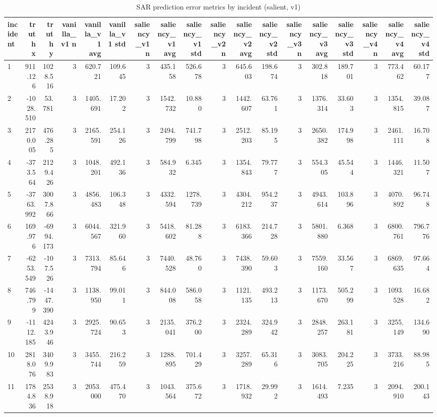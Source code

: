 \begin{table}[ht]
\centering
\caption{SAR prediction error metrics by incident (salient, v1)}
\label{tab:sar-incident-errors-salient,-v1}
\begin{tabular}{lrrrrrrrrrrrrrrrrr}
\hline
incident & truth x & truth y & vanilla\_v1 n & vanilla\_v1 avg & vanilla\_v1 std & saliency\_v1 n & saliency\_v1 avg & saliency\_v1 std & saliency\_v2 n & saliency\_v2 avg & saliency\_v2 std & saliency\_v3 n & saliency\_v3 avg & saliency\_v3 std & saliency\_v4 n & saliency\_v4 avg & saliency\_v4 std \\
\hline
1 & 911.126 & 1028.516 & 3 & 620.721 & 109.645 & 3 & 435.158 & 526.678 & 3 & 645.603 & 198.674 & 3 & 302.818 & 189.701 & 3 & 773.462 & 60.177 \\
2 & -1028.510 & 53.781 & 3 & 1405.691 & 17.202 & 3 & 1542.732 & 10.880 & 3 & 1442.607 & 63.761 & 3 & 1376.314 & 33.603 & 3 & 1354.815 & 39.087 \\
3 & 2170.005 & 476.285 & 3 & 2165.591 & 254.126 & 3 & 2494.799 & 741.798 & 3 & 2512.203 & 85.195 & 3 & 2650.382 & 174.998 & 3 & 2461.111 & 16.708 \\
4 & -373.564 & 2129.426 & 3 & 1048.201 & 492.136 & 3 & 584.932 & 6.345 & 3 & 1354.843 & 79.777 & 3 & 554.305 & 45.544 & 3 & 1446.321 & 11.507 \\
5 & -3763.992 & 3007.866 & 3 & 4856.483 & 106.348 & 3 & 4332.594 & 1278.739 & 3 & 4304.212 & 954.237 & 3 & 4943.614 & 103.896 & 3 & 4070.892 & 96.748 \\
6 & 169.976 & -6994.173 & 3 & 6044.567 & 321.960 & 3 & 5418.602 & 81.288 & 3 & 6183.366 & 214.728 & 3 & 5801.880 & 6.368 & 3 & 6800.761 & 796.776 \\
7 & -6253.549 & -107.526 & 3 & 7313.794 & 85.646 & 3 & 7440.528 & 48.760 & 3 & 7438.390 & 59.603 & 3 & 7559.160 & 33.567 & 3 & 6869.635 & 97.664 \\
8 & 746.799 & -1447.390 & 3 & 1138.950 & 99.011 & 3 & 844.008 & 586.058 & 3 & 1121.135 & 493.213 & 3 & 1173.670 & 505.299 & 3 & 1093.528 & 16.682 \\
9 & -1112.185 & 4243.946 & 3 & 2925.724 & 90.653 & 3 & 2135.041 & 376.200 & 3 & 2324.289 & 324.942 & 3 & 2848.257 & 263.181 & 3 & 3255.149 & 134.690 \\
10 & 2818.076 & 3409.983 & 3 & 3455.744 & 216.259 & 3 & 1288.895 & 701.429 & 3 & 3257.289 & 65.316 & 3 & 3083.705 & 204.225 & 3 & 3733.216 & 88.985 \\
11 & 1784.836 & 2538.918 & 3 & 2053.000 & 475.470 & 3 & 1043.564 & 375.672 & 3 & 1718.932 & 29.992 & 3 & 1614.493 & 7.235 & 3 & 2094.910 & 200.143 \\

\end{tabular}
\end{table}
